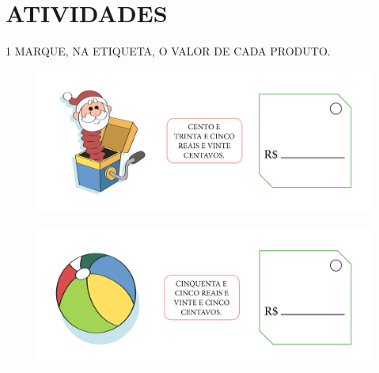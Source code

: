 


\section*{ATIVIDADES}

\num{1} MARQUE, NA ETIQUETA, O VALOR DE CADA PRODUTO.


\vspace{0.5cm}

\begin{figure}[H]
\includegraphics[width=\textwidth]{./media/SAEB_1ANO_MAT_FIGURA65.png}
\end{figure}

\vspace{0.5cm}

\begin{figure}[H]
\includegraphics[width=\textwidth]{./media/SAEB_1ANO_MAT_FIGURA66.png}
\end{figure}

